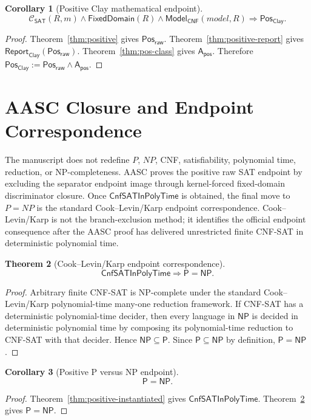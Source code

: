 \documentclass[11pt]{article}
\newtheorem{theorem}{Theorem}[section]
\newtheorem{corollary}[theorem]{Corollary}
\theoremstyle{definition}
\theoremstyle{remark}
\newcommand{\PosRaw}{\mathsf{Pos}_{\mathsf{raw}}}
\newcommand{\Apos}{\mathsf{A}_{\mathsf{pos}}}
\newcommand{\PosClay}{\mathsf{Pos}_{\mathsf{Clay}}}
\newcommand{\CnfSATP}{\mathsf{CnfSATInPolyTime}}
\newcommand{\Pclass}{\mathsf{P}}
\newcommand{\NPclass}{\mathsf{NP}}
\newcommand{\ClayCtx}{\mathcal{C}_{\mathsf{SAT}}(R,m)}
\newcommand{\ReportClay}[1]{\mathsf{Report}_{\mathsf{Clay}}(#1)}
\newcommand{\FixedDom}{\mathsf{FixedDomain}}
\newcommand{\ModelOfCnf}{\mathsf{Model}_{\mathsf{CNF}}}
\begin{document}
\begin{corollary}[Positive Clay mathematical endpoint]\label{cor:pos-clay}
\[
  \ClayCtx\wedge\FixedDom(R)\wedge\ModelOfCnf(model,R)\Rightarrow\PosClay.
\]
\end{corollary}

\begin{proof}
Theorem~\ref{thm:positive} gives \(\PosRaw\). Theorem~\ref{thm:positive-report} gives \(\ReportClay{\PosRaw}\). Theorem~\ref{thm:pos-class} gives \(\Apos\). Therefore \(\PosClay:=\PosRaw\wedge\Apos\).
\end{proof}

\section{AASC Closure and Endpoint Correspondence}

The manuscript does not redefine \(P\), \(NP\), CNF, satisfiability, polynomial time, reduction, or NP-completeness. AASC proves the positive raw SAT endpoint by excluding the separator endpoint image through kernel-forced fixed-domain discriminator closure. Once \(\CnfSATP\) is obtained, the final move to \(P=NP\) is the standard Cook--Levin/Karp endpoint correspondence. Cook--Levin/Karp is not the branch-exclusion method; it identifies the official endpoint consequence after the AASC proof has delivered unrestricted finite CNF-SAT in deterministic polynomial time.

\begin{theorem}[Cook--Levin/Karp endpoint correspondence]\label{cor:pnp}
\[
  \CnfSATP\Rightarrow \Pclass=\NPclass.
\]
\end{theorem}

\begin{proof}
Arbitrary finite CNF-SAT is NP-complete under the standard Cook--Levin/Karp polynomial-time many-one reduction framework. If CNF-SAT has a deterministic polynomial-time decider, then every language in \(\NPclass\) is decided in deterministic polynomial time by composing its polynomial-time reduction to CNF-SAT with that decider. Hence \(\NPclass\subseteq\Pclass\). Since \(\Pclass\subseteq\NPclass\) by definition, \(\Pclass=\NPclass\).
\end{proof}

\begin{corollary}[Positive P versus NP endpoint]\label{cor:pnp-final}
\[
  \Pclass=\NPclass.
\]
\end{corollary}

\begin{proof}
Theorem~\ref{thm:positive-instantiated} gives \(\CnfSATP\). Theorem~\ref{cor:pnp} gives \(\Pclass=\NPclass\).
\end{proof}
\end{document}
